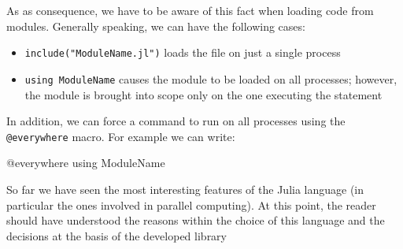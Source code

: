 As as consequence, we have to be aware of this fact when loading code from modules. Generally speaking, we can have the following cases:
\begin{itemize}
 \item \texttt{include("ModuleName.jl")} loads the file on just a single process
 \item \texttt{using ModuleName} causes the module to be loaded on all processes; however, the module is brought into scope only on the one executing the statement
\end{itemize}
In addition, we can force a command to run on all processes using the \texttt{@everywhere} macro. For example we can write:
\begin{julia}
 @everywhere using ModuleName
\end{julia}

So far we have seen the most interesting features of the Julia language (in particular the ones involved in parallel computing). At this point, the reader should have understood the reasons within the choice of this language and the decisions at the basis of the developed library